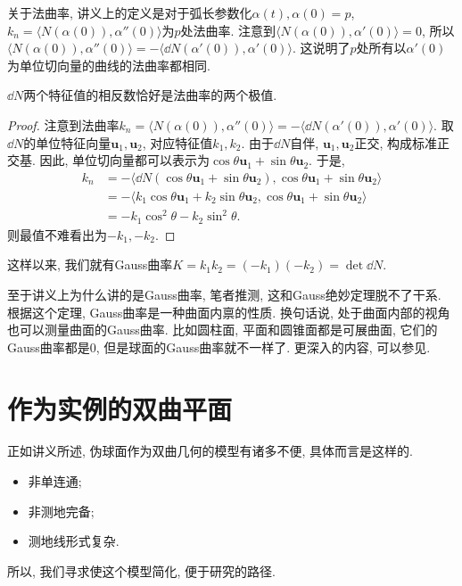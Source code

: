 \documentclass[./main.tex]{subfiles}
\begin{document}
关于法曲率, 讲义上的定义是对于弧长参数化\(\alpha(t),\alpha(0)=p\), \(k_n=\langle N(\alpha(0)),\alpha''(0)\rangle\)为\(p\)处法曲率. 注意到\(\langle N(\alpha(0)),\alpha'(0)\rangle=0\), 所以\(\langle N(\alpha(0)),\alpha''(0)\rangle=-\langle \dd N(\alpha'(0)),\alpha'(0)\rangle\). 这说明了\(p\)处所有以\(\alpha'(0)\)为单位切向量的曲线的法曲率都相同.

\begin{proposition}
    \(\dd N\)两个特征值的相反数恰好是法曲率的两个极值.
\end{proposition}
\begin{proof}
    注意到法曲率\(k_n=\langle N(\alpha(0)),\alpha''(0)\rangle=-\langle \dd N(\alpha'(0)),\alpha'(0)\rangle\). 取\(\dd N\)的单位特征向量\(\mathbf{u}_1,\mathbf{u}_2\), 对应特征值\(k_1,k_2\). 由于\(\dd N\)自伴, \(\mathbf{u}_1,\mathbf{u}_2\)正交, 构成标准正交基. 因此, 单位切向量都可以表示为\(\cos\theta\mathbf{u}_1+\sin\theta\mathbf{u}_2\). 于是,
    \begin{align*}
        k_n&=-\langle\dd N(\cos\theta\mathbf{u}_1+\sin\theta\mathbf{u}_2),\cos\theta\mathbf{u}_1+\sin\theta\mathbf{u}_2\rangle\\
           &=-\langle k_1\cos\theta\mathbf{u}_1+k_2\sin\theta\mathbf{u}_2,\cos\theta\mathbf{u}_1+\sin\theta\mathbf{u}_2\rangle\\
           &=-k_1\cos^2\theta-k_2\sin^2\theta.
    \end{align*}
    则最值不难看出为\(-k_1,-k_2\).
\end{proof}
这样以来, 我们就有Gauss曲率\(K=k_1k_2=(-k_1)(-k_2)=\det\dd N\).

至于讲义上为什么讲的是Gauss曲率, 笔者推测, 这和Gauss绝妙定理脱不了干系. 根据这个定理, Gauss曲率是一种曲面内禀的性质. 换句话说, 处于曲面内部的视角也可以测量曲面的Gauss曲率. 比如圆柱面, 平面和圆锥面都是可展曲面, 它们的Gauss曲率都是\(0\), 但是球面的Gauss曲率就不一样了. 更深入的内容, 可以参见\cite{docarmo}.
\section{作为实例的双曲平面}
正如讲义所述, 伪球面作为双曲几何的模型有诸多不便, 具体而言是这样的.
\begin{itemize}
    \item 非单连通;
    \item 非测地完备;
    \item 测地线形式复杂.
\end{itemize}
所以, 我们寻求使这个模型简化, 便于研究的路径.
\end{document}
